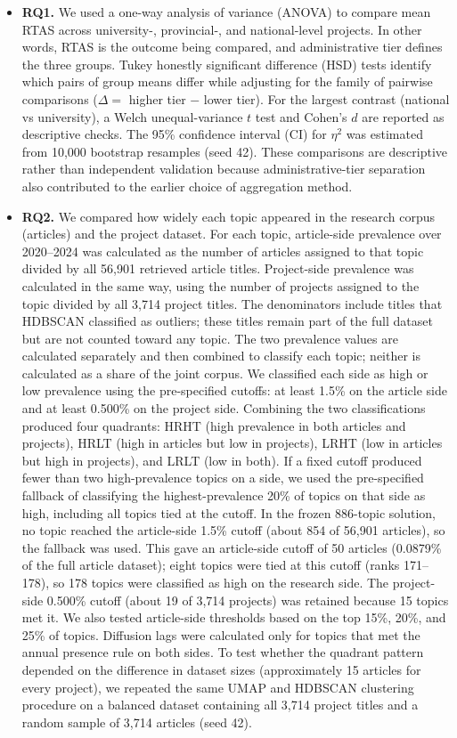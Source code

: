 \documentclass[pdflatex,sn-apa]{sn-jnl}
\begin{document}
\begin{itemize}
\item \textbf{RQ1.} We used a one-way analysis of variance (ANOVA) to compare mean RTAS across university-, provincial-, and national-level projects. In other words, RTAS is the outcome being compared, and administrative tier defines the three groups. Tukey honestly significant difference (HSD) tests identify which pairs of group means differ while adjusting for the family of pairwise comparisons ($\Delta=$ higher tier $-$ lower tier). For the largest contrast (national vs university), a Welch unequal-variance $t$ test and Cohen's $d$ are reported as descriptive checks. The 95\% confidence interval (CI) for $\eta^2$ was estimated from 10,000 bootstrap resamples (seed 42). These comparisons are descriptive rather than independent validation because administrative-tier separation also contributed to the earlier choice of aggregation method.

\item \textbf{RQ2.} We compared how widely each topic appeared in the research corpus (articles) and the project dataset. For each topic, article-side prevalence over 2020--2024 was calculated as the number of articles assigned to that topic divided by all 56,901 retrieved article titles. Project-side prevalence was calculated in the same way, using the number of projects assigned to the topic divided by all 3,714 project titles. The denominators include titles that HDBSCAN classified as outliers; these titles remain part of the full dataset but are not counted toward any topic. The two prevalence values are calculated separately and then combined to classify each topic; neither is calculated as a share of the joint corpus. We classified each side as high or low prevalence using the pre-specified cutoffs: at least 1.5\% on the article side and at least 0.500\% on the project side. Combining the two classifications produced four quadrants: HRHT (high prevalence in both articles and projects), HRLT (high in articles but low in projects), LRHT (low in articles but high in projects), and LRLT (low in both). If a fixed cutoff produced fewer than two high-prevalence topics on a side, we used the pre-specified fallback of classifying the highest-prevalence 20\% of topics on that side as high, including all topics tied at the cutoff. In the frozen 886-topic solution, no topic reached the article-side 1.5\% cutoff (about 854 of 56,901 articles), so the fallback was used. This gave an article-side cutoff of 50 articles (0.0879\% of the full article dataset); eight topics were tied at this cutoff (ranks 171--178), so 178 topics were classified as high on the research side. The project-side 0.500\% cutoff (about 19 of 3,714 projects) was retained because 15 topics met it. We also tested article-side thresholds based on the top 15\%, 20\%, and 25\% of topics. Diffusion lags were calculated only for topics that met the annual presence rule on both sides. To test whether the quadrant pattern depended on the difference in dataset sizes (approximately 15 articles for every project), we repeated the same UMAP and HDBSCAN clustering procedure on a balanced dataset containing all 3,714 project titles and a random sample of 3,714 articles (seed 42).


\end{itemize}
\end{document}
